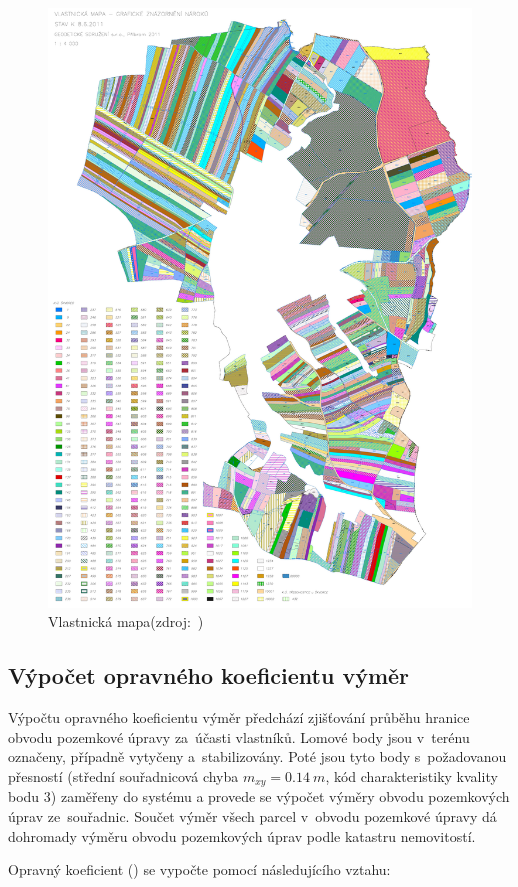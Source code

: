 	\begin{figure}[H]
		\centering
		\includegraphics[width=.8\textwidth]{./pictures/vlastnicka_mapa.pdf}
		\caption[Vlastnická mapa]{Vlastnická mapa(zdroj:~\citep{skvorec})}
		\label{fig:vlastnicka_mapa}
 	\end{figure}

\subsection{Výpočet opravného koeficientu výměr}
\label{vypocet_ok}

Výpočtu opravného koeficientu výměr předchází zjišťování průběhu hranice obvodu pozemkové úpravy za~účasti vlastníků. Lomové body jsou v~terénu označeny, případně vytyčeny a~stabilizovány. Poté jsou tyto body s~požadovanou přesností (střední souřadnicová chyba $m_{xy}=0.14~m$, kód charakteristiky kvality bodu $3$) zaměřeny do systému  a provede se výpočet výměry obvodu pozemkových úprav ze~souřadnic. Součet výměr všech parcel v~obvodu pozemkové úpravy dá dohromady výměru obvodu pozemkových úprav podle katastru nemovitostí.

Opravný koeficient () se vypočte pomocí následujícího vztahu:

